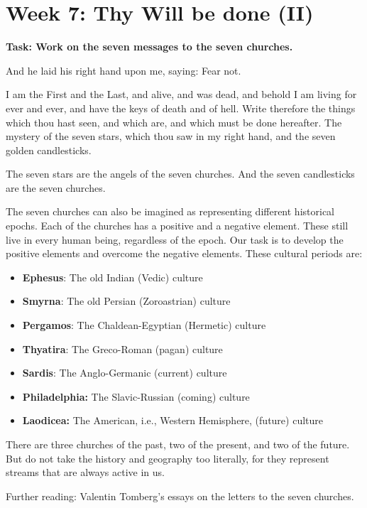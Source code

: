 \chapter{Week 7: Thy Will be done (II)}

\textbf{Task: Work on the seven messages to the seven churches.}

\begin{quotationx}
And he laid his right hand upon me, saying: Fear not.

I am the First and the Last, and alive, and was dead, and behold I am living for ever and ever, and have the keys of death and of hell. Write therefore the things which thou hast seen, and which are, and which must be done hereafter. The mystery of the seven stars, which thou saw in my right hand, and the seven golden candlesticks.

The seven stars are the angels of the seven churches. And the seven candlesticks are the seven churches. 
\end{quotationx}

The seven churches can also be imagined as representing different historical epochs. Each of the churches has a positive and a negative element. These still live in every human being, regardless of the epoch. Our task is to develop the positive elements and overcome the negative elements. These cultural periods are:

\begin{itemize}
\item \textbf{Ephesus}: The old Indian (Vedic) culture 
\item \textbf{Smyrna}: The old Persian (Zoroastrian) culture 
\item \textbf{Pergamos}: The Chaldean-Egyptian (Hermetic) culture 
\item \textbf{Thyatira}: The Greco-Roman (pagan) culture 
\item \textbf{Sardis}: The Anglo-Germanic (current) culture 
\item \textbf{Philadelphia:} The Slavic-Russian (coming) culture 
\item \textbf{Laodicea:} The American, i.e., Western Hemisphere, (future) culture 
\end{itemize}
There are three churches of the past, two of the present, and two of the future. But do not take the history and geography too literally, for they represent streams that are always active in us.

Further reading: Valentin Tomberg's essays on the letters to the seven churches.

